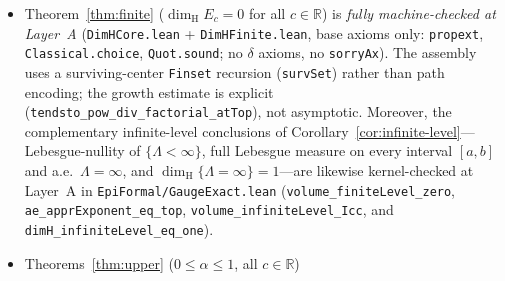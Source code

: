 \documentclass[11pt]{article}
\theoremstyle{definition}
\theoremstyle{remark}
\newcommand{\R}{\mathbb{R}}
\newcommand{\Z}{\mathbb{Z}}
\newcommand{\dimH}{\dim_{\mathrm{H}}}
\newcommand{\Lam}{\Lambda}
\begin{document}
\begin{itemize}[leftmargin=1.5em]
\texttt{EpiFormal/\allowbreak TrichotomyAndPolyExtension.lean} ($37$
declarations), \texttt{EpiFormal/\allowbreak PolyGaugeAndPhaseTransition.lean}
($22$ declarations), \texttt{EpiFormal/\allowbreak PolyWeightedUpper.lean} ($1$
declaration), and \texttt{EpiFormal/\allowbreak PolyWeightedLower.lean} ($8$
declarations; all $68$ declarations on base axioms only, zero \texttt{sorryAx}),
and corroborated by high-precision \texttt{mpmath} checks. Furthermore, the
universal extension to arbitrary growing-quotient recurrences
$Q_{j+1}=A_jQ_j+Q_{j-1}$ ($A_j\ge2$, $A_j\to\infty$) in
Section~\ref{sec:growing-rec}---Theorem~\ref{thm:growing-rec-spectrum}(i)--(iii)
(Kraaikamp--Liardet ratio identity, zero-level TFAE, full discrete spectrum
$\Z_{\ge0}\cup\{\infty\}$, and three-way positive-level splitting and critical
gauges on $\R$ and $\R/\Z$), Theorem~\ref{thm:growing-rec-dim-phase}(i)--(ii)
(subcritical dimension $(1-\tau)/(1+\tau\gamma_{\sup})$ and supercritical
secondary phase transition between $L_G$ and $\frac{1}{g}\Z$ at
$\tau_{\mathrm{crit}}=1+1/\gamma_{\sup}$), and
Corollary~\ref{cor:growing-rec-three-regimes}(i)--(iii) (Regimes~I--III including
the critical boundary $\tau=2$ for $A_j=2^{2^j}$)---is kernel-checked at Layer~A
across \texttt{EpiFormal/\allowbreak General\allowbreak Growing\allowbreak Rec.lean}
($21$ declarations) and \texttt{EpiFormal/\allowbreak General\allowbreak Growing\allowbreak Dim.lean}
($29$ declarations; all $50$ declarations on base axioms only, zero \texttt{sorryAx}).
\item Theorem~\ref{thm:finite} ($\dimH E_c=0$ for all $c\in\R$) is \emph{fully
machine-checked at Layer~A} (\texttt{DimHCore.lean} + \texttt{DimHFinite.lean},
base axioms only: \texttt{propext}, \texttt{Classical.choice},
\texttt{Quot.sound}; no $\delta$ axioms, no \texttt{sorryAx}). The assembly uses
a surviving-center \texttt{Finset} recursion (\texttt{survSet}) rather than path
encoding; the growth estimate is explicit
(\texttt{tendsto\_pow\_div\_factorial\_atTop}), not asymptotic. Moreover, the
complementary infinite-level conclusions of
Corollary~\ref{cor:infinite-level}---Lebesgue-nullity of $\{\Lam<\infty\}$,
full Lebesgue measure on every interval $[a,b]$ and a.e.\ $\Lam=\infty$, and
$\dimH\{\Lam=\infty\}=1$---are likewise kernel-checked at Layer~A in
\texttt{EpiFormal/\allowbreak{}GaugeExact.lean}
(\texttt{volume\_finiteLevel\_zero}, \texttt{ae\_apprExponent\_eq\_top},
\texttt{volume\_infiniteLevel\_Icc}, and
\texttt{dimH\_infiniteLevel\_eq\_one}).
\item Theorems~\ref{thm:upper} ($0\le\alpha\le1$, all $c\in\R$)

\end{itemize}
\end{document}
